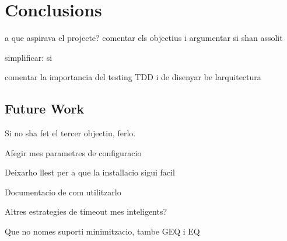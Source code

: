 \chapter{Conclusions} 
\label{Chapter7}


a que aspirava el projecte? comentar els objectius i argumentar si shan assolit

simplificar: si

comentar la importancia del testing TDD i de disenyar be larquitectura


\section{Future Work}

Si no sha fet el tercer objectiu, ferlo.

Afegir mes parametres de configuracio

Deixarho llest per a que la installacio sigui facil

Documentacio de com utilitzarlo


Altres estrategies de timeout mes inteligents?

Que no nomes suporti minimitzacio, tambe GEQ i EQ
